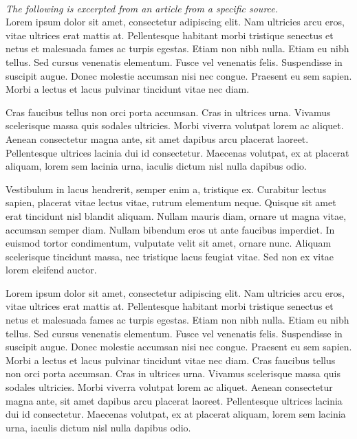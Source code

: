\documentclass[12pt, letterpaper]{article}
\begin{document}
    \vspace{5mm}
{}\\
    \vspace{5mm}
    \justifying
    \textit{The following is excerpted from an article from a specific source.}\vspace{2.5mm}\\
Lorem ipsum dolor sit amet, consectetur adipiscing elit. Nam ultricies arcu eros, vitae ultrices erat mattis at. Pellentesque habitant morbi tristique senectus et netus et malesuada fames ac turpis egestas. Etiam non nibh nulla. Etiam eu nibh tellus. Sed cursus venenatis elementum. Fusce vel venenatis felis. Suspendisse in suscipit augue. Donec molestie accumsan nisi nec congue. Praesent eu sem sapien. Morbi a lectus et lacus pulvinar tincidunt vitae nec diam.

Cras faucibus tellus non orci porta accumsan. Cras in ultrices urna. Vivamus scelerisque massa quis sodales ultricies. Morbi viverra volutpat lorem ac aliquet. Aenean consectetur magna ante, sit amet dapibus arcu placerat laoreet. Pellentesque ultrices lacinia dui id consectetur. Maecenas volutpat, ex at placerat aliquam, lorem sem lacinia urna, iaculis dictum nisl nulla dapibus odio.

Vestibulum in lacus hendrerit, semper enim a, tristique ex. Curabitur lectus sapien, placerat vitae lectus vitae, rutrum elementum neque. Quisque sit amet erat tincidunt nisl blandit aliquam. Nullam mauris diam, ornare ut magna vitae, accumsan semper diam. Nullam bibendum eros ut ante faucibus imperdiet. In euismod tortor condimentum, vulputate velit sit amet, ornare nunc. Aliquam scelerisque tincidunt massa, nec tristique lacus feugiat vitae. Sed non ex vitae lorem eleifend auctor.

Lorem ipsum dolor sit amet, consectetur adipiscing elit. Nam ultricies arcu eros, vitae ultrices erat mattis at. Pellentesque habitant morbi tristique senectus et netus et malesuada fames ac turpis egestas. Etiam non nibh nulla. Etiam eu nibh tellus. Sed cursus venenatis elementum. Fusce vel venenatis felis. Suspendisse in suscipit augue. Donec molestie accumsan nisi nec congue. Praesent eu sem sapien. Morbi a lectus et lacus pulvinar tincidunt vitae nec diam.
Cras faucibus tellus non orci porta accumsan. Cras in ultrices urna. Vivamus scelerisque massa quis sodales ultricies. Morbi viverra volutpat lorem ac aliquet. Aenean consectetur magna ante, sit amet dapibus arcu placerat laoreet. Pellentesque ultrices lacinia dui id consectetur. Maecenas volutpat, ex at placerat aliquam, lorem sem lacinia urna, iaculis dictum nisl nulla dapibus odio.
\end{document}
